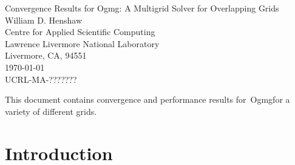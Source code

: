 \documentclass{article}
\begin{document}

\newcommand{\ogen}{\homeHenshaw/res/ogen}
\newcommand{\figures}{\homeHenshaw/Overture/docFigures}
\newcommand{\automg}{\homeHenshaw/papers/automg}
\newcommand{\ogmgDir}{\homeHenshaw/Overture/ogmg/doc}
\newcommand{\ogmgDocDir}{\homeHenshaw/Overture/ogmg/doc}

\newcommand{\Ogen}{{Ogen}}
\newcommand{\Overture}{{Overture}}
\newcommand{\Ogmg}{{Ogmg}}

\newcommand{\tablefontsize}{\footnotesize}
\newcommand{\clipfig}{}




\baselineskip
\begin{flushleft}
{\Large
 Convergence Results for Ogmg: A Multigrid Solver for Overlapping Grids \\
}
\vspace{3\baselineskip}
William D. Henshaw   \\                    
\vspace{2\baselineskip}
Centre for Applied Scientific Computing \\
Lawrence Livermore National Laboratory    \\
Livermore, CA, 94551   \\
\vspace{2\baselineskip}
\today\\
\vspace{\baselineskip}
UCRL-MA-???????


\vspace{4\baselineskip}

This document contains convergence and performance results for~\Ogmg for a variety
of different grids.

\end{flushleft}

\clearpage
\tableofcontents



\clearpage
\section{Introduction}
\end{document}
